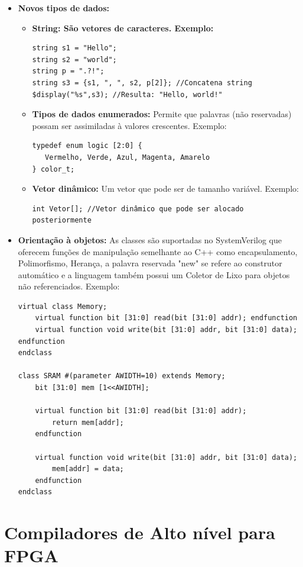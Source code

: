 \documentclass[12pt,a4paper]{article}
\begin{document}
\begin{itemize}
\item {\bf Novos tipos de dados:}
\begin{itemize}
\item{\bf String: São vetores de caracteres. Exemplo:}
\begin{verbatim}
string s1 = "Hello";
string s2 = "world";
string p = ".?!";
string s3 = {s1, ", ", s2, p[2]}; //Concatena string
$display("%s",s3); //Resulta: "Hello, world!"
\end{verbatim}
\item {\bf Tipos de dados enumerados:} Permite que palavras (não reservadas) possam ser assimiladas à valores crescentes. \newline Exemplo:
\begin{verbatim}
typedef enum logic [2:0] {
   Vermelho, Verde, Azul, Magenta, Amarelo
} color_t;
\end{verbatim}
\item {\bf Vetor dinâmico:} Um vetor que pode ser de tamanho variável. Exemplo:
\begin{verbatim}
int Vetor[]; //Vetor dinâmico que pode ser alocado posteriormente
\end{verbatim}
\end{itemize}
\item {\bf Orientação à objetos:} As classes são suportadas no SystemVerilog que oferecem funções de manipulação semelhante ao C++ como encapsulamento, Polimorfismo, Herança, a palavra reservada "new" se refere ao construtor automático e a linguagem também possui um Coletor de Lixo para objetos não referenciados. Exemplo:
\begin{verbatim}
virtual class Memory;
    virtual function bit [31:0] read(bit [31:0] addr); endfunction
    virtual function void write(bit [31:0] addr, bit [31:0] data); endfunction
endclass

class SRAM #(parameter AWIDTH=10) extends Memory;
    bit [31:0] mem [1<<AWIDTH];

    virtual function bit [31:0] read(bit [31:0] addr);
        return mem[addr];
    endfunction

    virtual function void write(bit [31:0] addr, bit [31:0] data);
        mem[addr] = data;
    endfunction
endclass

\end{verbatim}
\end{itemize}
\section{Compiladores de Alto nível para FPGA}
\end{document}
